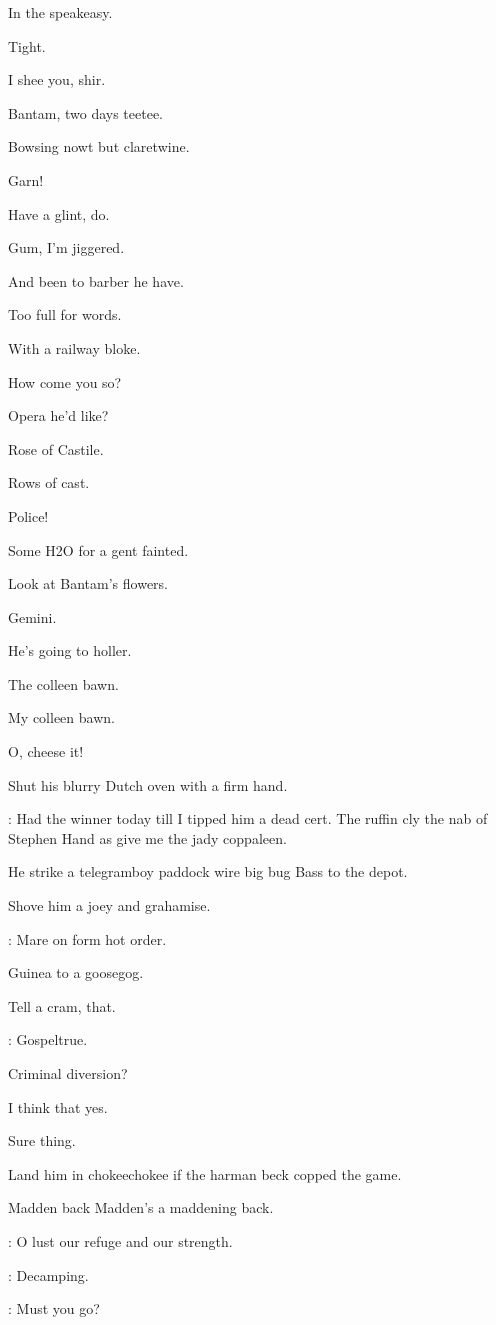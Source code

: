 In the speakeasy.

Tight.

I shee you, shir.

Bantam, two days teetee.

Bowsing nowt but claretwine.

Garn!

Have a glint, do.

Gum, I'm jiggered.

And been to barber he have.

Too full for words.

With a railway bloke.

How come you so?

Opera he'd like?

Rose of Castile.

Rows of cast.

Police!

Some H2O for a gent fainted.

Look at Bantam's flowers.

Gemini.

He's going to holler.

The colleen bawn.

My colleen bawn.

O, cheese it!

Shut his blurry Dutch oven with a firm hand.

\lenehan: Had the winner today till I tipped him a dead cert.
The ruffin cly the nab of Stephen Hand as give me the jady coppaleen.

He strike a telegramboy paddock wire big bug Bass to the depot.

Shove him a joey and grahamise.

\lenehan: Mare on form hot order.

Guinea to a goosegog.

Tell a cram, that.

\lenehan: Gospeltrue.

Criminal diversion?

I think that yes.

Sure thing.

Land him in chokeechokee if the harman beck copped the game.

Madden back Madden's a maddening back.

\lynch: O lust our refuge and our strength.

\madden: Decamping.

\bannon: Must you go?

